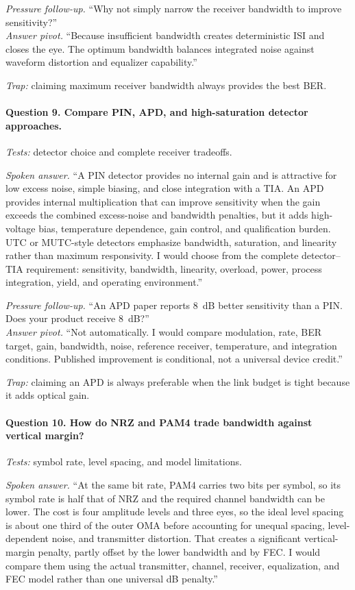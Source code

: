 \textit{Pressure follow-up.} ``Why not simply narrow the receiver bandwidth to
improve sensitivity?''\\
\textit{Answer pivot.} ``Because insufficient bandwidth creates deterministic ISI
and closes the eye. The optimum bandwidth balances integrated noise against
waveform distortion and equalizer capability.''

\textit{Trap:} claiming maximum receiver bandwidth always provides the best BER.

\paragraph{Question 9. Compare PIN, APD, and high-saturation detector
approaches.}
\textit{Tests:} detector choice and complete receiver tradeoffs.

\textit{Spoken answer.}
``A PIN detector provides no internal gain and is attractive for low excess
noise, simple biasing, and close integration with a TIA. An APD provides
internal multiplication that can improve sensitivity when the gain exceeds the
combined excess-noise and bandwidth penalties, but it adds high-voltage bias,
temperature dependence, gain control, and qualification burden. UTC or MUTC-style
detectors emphasize bandwidth, saturation, and linearity rather than maximum
responsivity. I would choose from the complete detector--TIA requirement:
sensitivity, bandwidth, linearity, overload, power, process integration, yield,
and operating environment.''

\textit{Pressure follow-up.} ``An APD paper reports 8~dB better sensitivity than
a PIN. Does your product receive 8~dB?''\\
\textit{Answer pivot.} ``Not automatically. I would compare modulation, rate, BER
target, gain, bandwidth, noise, reference receiver, temperature, and integration
conditions. Published improvement is conditional, not a universal device
credit.''

\textit{Trap:} claiming an APD is always preferable when the link budget is
tight because it adds optical gain.

\paragraph{Question 10. How do NRZ and PAM4 trade bandwidth against vertical
margin?}
\textit{Tests:} symbol rate, level spacing, and model limitations.

\textit{Spoken answer.}
``At the same bit rate, PAM4 carries two bits per symbol, so its symbol rate is
half that of NRZ and the required channel bandwidth can be lower. The cost is
four amplitude levels and three eyes, so the ideal level spacing is about one
third of the outer OMA before accounting for unequal spacing, level-dependent
noise, and transmitter distortion. That creates a significant vertical-margin
penalty, partly offset by the lower bandwidth and by FEC. I would compare them
using the actual transmitter, channel, receiver, equalization, and FEC model
rather than one universal dB penalty.''

